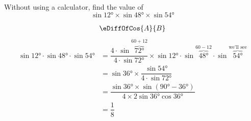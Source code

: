 

\question[3] Without using a calculator, find the value of
\[ \sin\ang{12}\times\sin\ang{48}\times\sin\ang{54} \]

\ifprintanswers
\fi 

\begin{solution}[\halfpage]
    \begin{align}
      \eDiffOfCos{A}{B}
    \end{align}
    \begin{align}
       \sin\ang{12}\cdot\sin\ang{48}\cdot\sin\ang{54} &= 
       \dfrac{4\cdot\sin\overbrace{\ang{72}}^{60+12}}
       {4\cdot\sin\ang{72}}\times\sin\ang{12}\cdot
       \sin\overbrace{\ang{48}}^{60-12}\cdot
       \sin\overbrace{\ang{54}}^{\text{we'll see}} \\
       &= \sin\ang{36}\times\dfrac{\sin\ang{54}}{4\cdot\sin\ang{72}} \\
       &= \dfrac{\sin\ang{36}\times\sin(\ang{90}-\ang{36})}{4\times 2\sin\ang{36}\cos\ang{36}} \\
       &= \dfrac{1}{8}
    \end{align}
\end{solution}
\ifprintanswers\begin{codex}\end{codex}\fi
